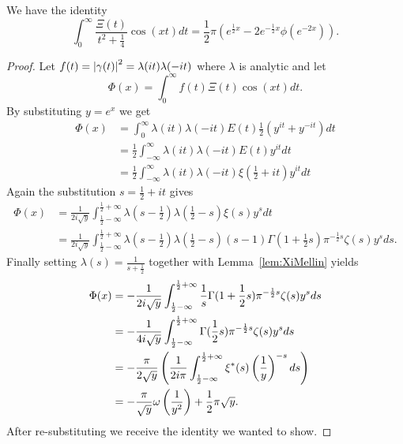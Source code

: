 \begin{theorem}
	We have the identity
\begin{equation*}	
	\int _0 ^{\infty} \frac{\Xi(t)}{t^2 + \frac{1}{4}} \cos(xt) dt = \frac{1}{2} \pi (e^{\frac{1}{2} x} - 2e^{-\frac{1}{2}x} \phi(e^{-2x})).
\end{equation*}
\end{theorem}
\begin{proof}
	Let $f(t) = \left|\gamma(t)\right|^2 = \lambda(it) \lambda(-it)$ where $\lambda$ is analytic and let
\begin{equation*}
	\Phi(x) = \int _0 ^{\infty} f(t) \Xi(t) \cos(xt) dt.	
\end{equation*}
	By substituting $y = e^x$ we get
\begin{equation*}
\begin{aligned}
	\Phi(x) 
		&= \int _0 ^\infty \lambda(it) \lambda(-it) E(t) \frac{1}{2}(y^{it} + y^{-it}) dt \\
		&= \frac{1}{2} \int _{-\infty} ^\infty \lambda(it) \lambda(-it) E(t) y^{it} dt \\
		&= \frac{1}{2} \int _{-\infty} ^\infty \lambda(it) \lambda(-it) \xi(\frac{1}{2} + it) y^{it} dt
\end{aligned}
\end{equation*}
	Again the substitution $s = \frac{1}{2} + it$ gives
\begin{equation*}
\begin{aligned}
	\Phi(x) 
		&= \frac{1}{2 i\sqrt{y}} \int _{\frac{1}{2} -\infty} ^{\frac{1}{2} + \infty} \lambda(s - \frac{1}{2}) \lambda(\frac{1}{2} - s) \xi(s) y^{s} dt \\
		&= \frac{1}{2 i\sqrt{y}} \int _{\frac{1}{2} -\infty} ^{\frac{1}{2} + \infty} \lambda(s - \frac{1}{2}) \lambda(\frac{1}{2} - s) (s - 1) \Gamma(1 + \frac{1}{2}s) \pi ^{-\frac{1}{2} s} \zeta(s) y^{s} ds.
\end{aligned}
\end{equation*}
	Finally setting $\lambda(s) = \frac{1}{s + \frac{1}{2}}$ together with Lemma~\ref{lem:XiMellin} yields 
\begin{equation*}
\begin{aligned}
	\Phi(x) 
		&= -\frac{1}{2 i\sqrt{y}} \int _{\frac{1}{2} -\infty} ^{\frac{1}{2} + \infty} \frac{1}{s} \Gamma(1 + \frac{1}{2} s) \pi ^{-\frac{1}{2} s} \zeta(s) y^{s} ds \\
		&= -\frac{1}{4 i\sqrt{y}} \int _{\frac{1}{2} -\infty} ^{\frac{1}{2} + \infty} \Gamma(\frac{1}{2} s) \pi ^{-\frac{1}{2} s} \zeta(s) y^{s} ds \\
		&= -\frac{\pi}{2 \sqrt{y}} \left(\frac{1}{2 i \pi} \int _{\frac{1}{2} -\infty} ^{\frac{1}{2} + \infty} \xi^*(s) \left(\frac{1}{y}\right)^{-s} ds\right) \\
		&= -\frac{\pi}{\sqrt{y}} \omega\left(\frac{1}{y^2}\right) + \frac{1}{2} \pi \sqrt{y}.
\end{aligned}
\end{equation*}
	After re-substituting we receive the identity we wanted to show.
\end{proof}



